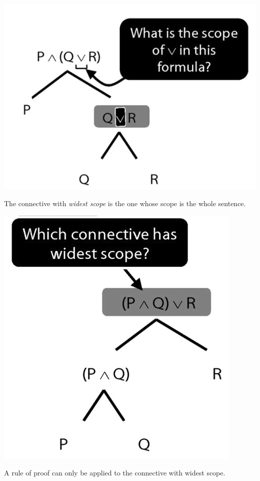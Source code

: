 \documentclass[12pt]{extarticle}
\begin{document}
\begin{multicols*}{3}
\begin{center}
\includegraphics[scale=0.3]{img/unit_290_scope_q.png}
\end{center}
The connective with \emph{widest scope} is the one whose scope is the whole sentence.
 
\begin{center}
\includegraphics[scale=0.3]{img/unit_290_scope_q2.png}
\end{center}
A rule of proof can only be applied to the connective with widest scope.
 

\end{multicols*}
\end{document}
